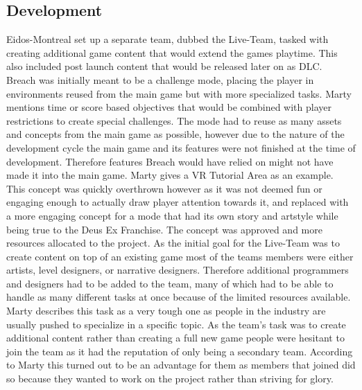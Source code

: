 \documentclass[a4paper]{article}
\begin{document}
\subsection{Development}
Eidos-Montreal set up a separate team, dubbed the Live-Team, tasked with creating additional game content that would extend the games playtime. This also included post launch content that would be released later on as DLC.\\
Breach was initially meant to be a challenge mode, placing the player in environments reused from the main game but with more specialized tasks. Marty mentions time or score based objectives that would be combined with player restrictions to create special challenges.
The mode had to reuse as many assets and concepts from the main game as possible, however due to the nature of the development cycle the main game and its features were not finished at the time of development. Therefore features Breach would have relied on might not have made it into the main game. Marty gives a VR Tutorial Area as an example. \\
This concept was quickly overthrown however as it was not deemed fun or engaging enough to actually draw player attention towards it, and replaced with a more engaging concept for a mode that had its own story and artstyle while being true to the Deus Ex Franchise. The concept was approved and more resources allocated to the project. As the initial goal for the Live-Team was to create content on top of an existing game most of the teams members were either artists, level designers, or narrative designers. Therefore additional programmers and designers had to be added to the team, many of which had to be able to handle as many different tasks at once because of the limited resources available. Marty describes this task as a very tough one as people in the industry are usually pushed to specialize in a specific topic. As the team's task was to create additional content rather than creating a full new game people were hesitant to join the team as it had the reputation of only being a secondary team. According to Marty this turned out to be an advantage for them as members that joined did so because they wanted to work on the project rather than striving for glory.
\end{document}
